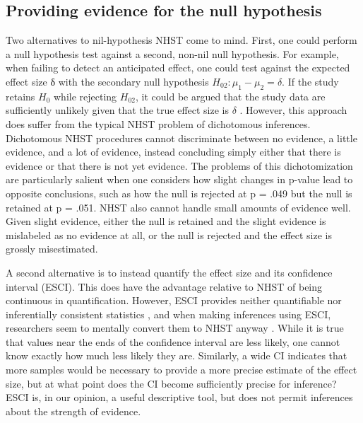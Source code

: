 \documentclass[fignum,nobf,man]{apa}
\begin{document}
\subsection{Providing evidence for the null hypothesis}
Two alternatives to nil-hypothesis NHST come to mind. First, one could perform a null hypothesis test against a second, non-nil null hypothesis. For example, when failing to detect an anticipated effect, one could test against the expected effect size δ with the secondary null hypothesis $H_{02}: \mu_1 - \mu_2 = \delta$. If the study retains $H_0$ while rejecting $H_{02}$, it could be argued that the study data are sufficiently unlikely given that the true effect size is $\delta$ \citep[e.g.,][]{Simonsohn:etal:2014}. However, this approach does suffer from the typical NHST problem of dichotomous inferences. Dichotomous NHST procedures cannot discriminate between no evidence, a little evidence, and a lot of evidence, instead concluding simply either that there is evidence or that there is not yet evidence. The problems of this dichotomization are particularly salient when one considers how slight changes in p-value lead to opposite conclusions, such as how the null is rejected at p = .049 but the null is retained at p = .051. NHST also cannot handle small amounts of evidence well. Given slight evidence, either the null is retained and the slight evidence is mislabeled as no evidence at all, or the null is rejected and the effect size is grossly misestimated. 

A second alternative is to instead quantify the effect size and its confidence interval (ESCI). This does have the advantage relative to NHST of being continuous in quantification.  However, ESCI provides neither quantifiable nor inferentially consistent statistics \citep[see][]{Morey:etal:2014}, and when making inferences using ESCI, researchers seem to mentally convert them to NHST anyway \citep{Hoekstra:etal:2014}. While it is true that values near the ends of the confidence interval are less likely, one cannot know exactly how much less likely they are. Similarly, a wide CI indicates that more samples would be necessary to provide a more precise estimate of the effect size, but at what point does the CI become sufficiently precise for inference? ESCI is, in our opinion, a useful descriptive tool, but does not permit inferences about the strength of evidence.
\end{document}
